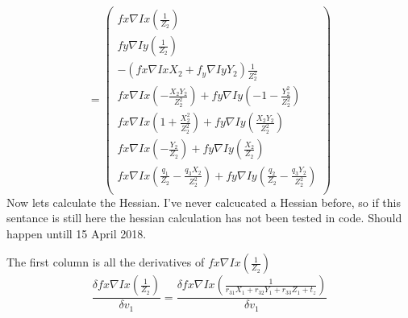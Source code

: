 \documentclass[a4paper,12pt]{article}
\begin{document}
\[
= \begin{pmatrix}
fx \nabla Ix( \frac{1}{Z_2}) \\ 
fy \nabla Iy( \frac{1}{Z_2}) \\ 
-(fx \nabla Ix X_2 + f_y\nabla Iy Y_2 )\frac{ 1}{Z_2^2} \\ 
fx \nabla Ix (-\frac{X_2 Y_2}{Z_2^2} ) + fy \nabla Iy ( -1-\frac{Y_2^2}{Z_2^2} ) \\
fx \nabla Ix ( 1+\frac{X_2^2}{Z_2^2} ) + fy \nabla Iy (  \frac{X_2 Y_2}{Z_2^2} ) \\
fx \nabla Ix ( -\frac{Y_2}{Z_2} ) + fy \nabla Iy (  \frac{X_2}{Z_2}) \\
fx \nabla Ix (  \frac{q_1}{Z_2} - \frac{q_3 X_2}{Z_2^2} ) + fy \nabla Iy (  \frac{q_2}{Z_2} - \frac{q_3 Y_2}{Z_2^2}) \\
\end{pmatrix} 
\]
Now lets calculate the Hessian. I've never calcucated a Hessian before, so if this sentance is still here the hessian calculation has not been tested in code. Should happen untill 15 April 2018.
\par
The first column is all the derivatives of $fx \nabla Ix( \frac{1}{Z_2})$
\[
\frac{\delta fx \nabla Ix( \frac{1}{Z_2})} {\delta v_1} = 
\frac{\delta fx \nabla Ix( \frac{1}{r_{31}X_1+r_{32}Y_1+r_{33}Z_1 + t_z})} {\delta v_1}
\]
\end{document}
